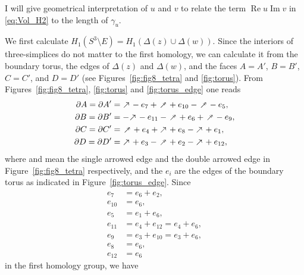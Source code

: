 \documentclass{amsart}
\renewcommand{\Re}{\operatorname{Re}}
\renewcommand{\Im}{\operatorname{Im}}
\theoremstyle{definition}
\theoremstyle{remark}
\numberwithin{equation}{section}
\begin{document}
\par
I will give geometrical interpretation of $u$ and $v$ to relate the term $\Re{u}\Im{v}$ in \eqref{eq:Vol_H2} to the length of $\gamma_u$.
\par
We first calculate $H_1(S^3\setminus{E})=H_1(\Delta(z)\cup\Delta(w))$.
Since the interiors of three-simplices do not matter to the first homology, we can calculate it from the boundary torus, the edges of $\Delta(z)$ and $\Delta(w)$, and the faces $A=A'$, $B=B'$, $C=C'$, and $D=D'$ (see Figures~\ref{fig:fig8_tetra} and \ref{fig:torus}).
From Figures~\ref{fig:fig8_tetra}, \ref{fig:torus} and \ref{fig:torus_edge} one reads
\begin{align*}
  \partial A=\partial A'
  &=
   \raisebox{-1mm}{\rotatebox{45}{$\rightarrow$}}-e_{7}
  +\raisebox{-1mm}{\rotatebox{45}{$\twoheadrightarrow$}}+e_{10}
  -\raisebox{-1mm}{\rotatebox{45}{$\twoheadrightarrow$}}-e_{5},
  \\
  \partial B=\partial B'
  &=
  -\raisebox{-1mm}{\rotatebox{45}{$\rightarrow$}}-e_{11}
  -\raisebox{-1mm}{\rotatebox{45}{$\twoheadrightarrow$}}+e_{6}
  +\raisebox{-1mm}{\rotatebox{45}{$\twoheadrightarrow$}}-e_{9},
  \\
  \partial C=\partial C'
  &=
   \raisebox{-1mm}{\rotatebox{45}{$\twoheadrightarrow$}}+e_{4}
  +\raisebox{-1mm}{\rotatebox{45}{$\rightarrow$}}+e_{8}
  -\raisebox{-1mm}{\rotatebox{45}{$\rightarrow$}}+e_{1},
  \\
  \partial D=\partial D'
  &=
   \raisebox{-1mm}{\rotatebox{45}{$\rightarrow$}}+e_{3}
  -\raisebox{-1mm}{\rotatebox{45}{$\twoheadrightarrow$}}+e_{2}
  -\raisebox{-1mm}{\rotatebox{45}{$\rightarrow$}}+e_{12},
\end{align*}
where  and  mean the single arrowed edge and the double arrowed edge in Figure~\ref{fig:fig8_tetra} respectively, and the $e_i$ are the edges of the boundary torus as indicated in Figure~\ref{fig:torus_edge}.
Since
\begin{align*}
  e_{7}&=e_{6}+e_{2},
  \\
  e_{10}&=e_{6},
  \\
  e_{5}&=e_{1}+e_{6},
  \\
  e_{11}&=e_{4}+e_{12}=e_{4}+e_{6},
  \\
  e_{9}&=e_{3}+e_{10}=e_{3}+e_{6},
  \\
  e_{8}&=e_{6},
  \\
  e_{12}&=e_{6}
\end{align*}
in the first homology group, we have
\end{document}
